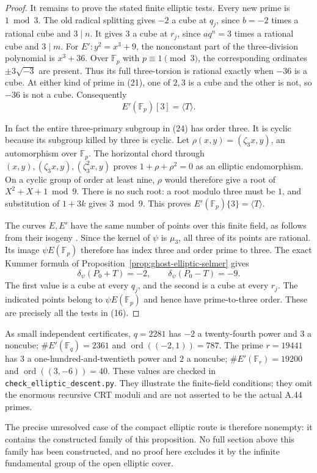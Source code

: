 \begin{proof}
It remains to prove the stated finite elliptic tests.
Every new prime is \(1\bmod3\). The old radical
splitting gives \(-2\) a cube at \(q_j\), since
\(b=-2\) times a rational cube and \(3\mid n\).
It gives \(3\) a cube at \(r_j\), since
\(aq^n=3\) times a rational cube and \(3\mid m\).
For \(E':y^2=x^3+9\), the nonconstant part of
the three-division polynomial is \(x^3+36\).
Over \(\mathbb F_p\) with \(p\equiv1\pmod3\),
the corresponding ordinates \(\pm3\sqrt{-3}\)
are present. Thus its full three-torsion is rational
exactly when \(-36\) is a cube. At either kind of
prime in (21), one of \(2,3\) is a cube and the
other is not, so \(-36\) is not a cube. Consequently
\[
                 E'(\mathbb F_p)[3]=\langle T\rangle.
                                                        \tag{24}
\]

In fact the entire three-primary subgroup in (24)
has order three. It is cyclic because its subgroup
killed by three is cyclic. Let
\(\rho(x,y)=(\zeta_3x,y)\), an automorphism over
\(\mathbb F_p\). The horizontal chord through
\((x,y),(\zeta_3x,y),(\zeta_3^2x,y)\) proves
\(1+\rho+\rho^2=0\) as an elliptic endomorphism.
On a cyclic group of order at least nine, \(\rho\)
would therefore give a root of \(X^2+X+1\bmod9\).
There is no such root: a root modulo three must be
\(1\), and substitution of \(1+3k\) gives
\(3\bmod9\). This proves
\(E'(\mathbb F_p)\{3\}=\langle T\rangle\).

The curves \(E,E'\) have the same number of points
over this finite field, as follows from their isogeny
\cite[V.4.1]{GhostMilneEC}. Since the kernel of
\(\psi\) is \(\mu_3\), all three of its points
are rational. Its image \(\psi E(\mathbb F_p)\)
therefore has index three and order prime to three.
The exact Kummer formula of
Proposition~\ref{prop:ghost-elliptic-selmer} gives
\[
 \delta_\psi(P_0+T)=-2,
        \qquad \delta_\psi(P_0-T)=-9.
\]
The first value is a cube at every \(q_j\), and
the second is a cube at every \(r_j\). The indicated
points belong to \(\psi E(\mathbb F_p)\) and hence
have prime-to-three order. These are precisely all
the tests in (16).
\end{proof}

As small independent certificates, \(q=2281\) has
\(-2\) a twenty-fourth power and \(3\) a noncube;
\(\#E'(\mathbb F_q)=2361\) and
\(\operatorname{ord}((-2,1))=787\).
The prime \(r=19441\) has \(3\) a one-hundred-and-twentieth
power and \(2\) a noncube;
\(\#E'(\mathbb F_r)=19200\) and
\(\operatorname{ord}((3,-6))=40\).
These values are checked in
\texttt{check\_elliptic\_descent.py}. They illustrate the
finite-field conditions; they omit the enormous recursive
CRT moduli and are not asserted to be the actual A.44 primes.

The precise unresolved case of the compact elliptic route
is therefore nonempty: it contains the constructed family
of this proposition. No full section above this family
has been constructed, and no proof here excludes it by
the infinite fundamental group of the open elliptic cover.
